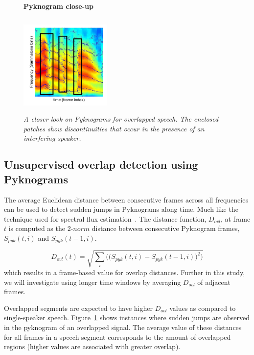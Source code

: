 {\begin{figure}[h!]
	\centering
	\vspace{1mm}
	\textbf{Pyknogram close-up}\par\medskip
	\vspace{-1mm}
	\includegraphics[height =2.0in, width=0.4\textwidth]{figures/co-channel_pyknogram-crop}
	\vspace{-1mm}
	\caption{\it A closer look on Pyknograms for overlapped speech. The enclosed patches show discontinuities that occur in the presence of an interfering speaker.}
	\vspace{-1mm}
	\label{fig:pyknograms_for_overlaps}
\end{figure}

\newpage
\subsection{Unsupervised overlap detection using Pyknograms}
\label{ssec:unsupervised_ovl_det_pykno}
The average Euclidean distance between consecutive frames across all frequencies can be used to detect sudden jumps in Pyknograms along time. 
Much like the technique used for spectral flux estimation~\cite{Rossignol_spectralflux}. 
The distance function, $D_{ovl}$, at frame $t$ is computed as the $2$-$norm$ distance between consecutive Pyknogram frames, $S_{pyk}(t,i)$ and $S_{pyk}(t-1,i)$. 

\begin{equation}
\label{eq:ovl_det_score}
D_{ovl}(t) = \sqrt{\sum_i\Big(\big(S_{pyk}(t,i)-S_{pyk}(t-1,i)\big)^2\Big)}
\end{equation}
which results in a frame-based value for overlap distances. 
Further in this study, we will investigate using longer time windows by averaging $D_{ovl}$ of adjacent frames. 


Overlapped segments are expected to have higher $D_{ovl}$ values as compared to single-speaker speech. 
Figure~\ref{fig:pyknograms_for_overlaps} shows instances where sudden jumps are observed in the pyknogram of an overlapped signal. 
The average value of these distances for all frames in a speech segment corresponds to the amount of overlapped regions (higher values are associated with greater overlap). 

}
